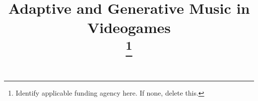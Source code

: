 \documentclass[conference]{IEEEtran}
\begin{document}
\title{Adaptive and Generative
Music in Videogames\\

{\footnotesize \textsuperscript{}}
\thanks{Identify applicable funding agency here. If none, delete this.}
}



\maketitle











\vspace{12pt}
\end{document}
